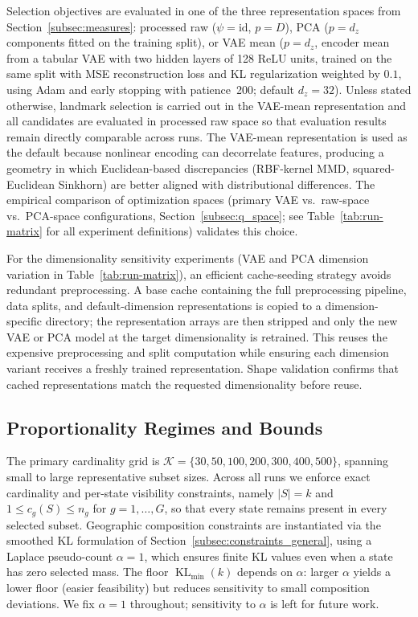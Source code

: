 \documentclass[10pt,journal]{IEEEtran}
\newcommand{\latentDim}{d_z}              %
\newcommand{\kGrid}{\mathcal{K}}
\newcommand{\kGridDef}{\{30,50,100,200,300,400,500\}}
\newcommand{\1}{\mathbf{1}}
\DeclareMathOperator{\KL}{KL}
\theoremstyle{ieeethm}
\begin{document}
Selection objectives are evaluated in one of the three representation spaces from
Section~\ref{subsec:measures}: processed raw ($\psi=\mathrm{id}$, $p=D$), PCA ($p=\latentDim$
components fitted on the training split), or VAE mean ($p=\latentDim$, encoder mean from a tabular VAE with two hidden layers of 128
ReLU units, trained on the same split with MSE reconstruction loss and KL regularization
weighted by $0.1$, using Adam and early stopping with patience~200; default $\latentDim=32$).
Unless stated otherwise, landmark selection is carried out in the VAE-mean representation and
all candidates are evaluated in processed raw space so that evaluation results remain directly
comparable across runs. The VAE-mean representation is used as the default because nonlinear
encoding can decorrelate features, producing a geometry in which Euclidean-based discrepancies
(RBF-kernel MMD, squared-Euclidean Sinkhorn) are better aligned with distributional differences.
The empirical comparison of optimization spaces (primary VAE vs.\ raw-space vs.\ PCA-space configurations,
Section~\ref{subsec:q_space}; see Table~\ref{tab:run-matrix} for all experiment definitions)
validates this choice.

For the dimensionality sensitivity experiments (VAE and PCA dimension variation in Table~\ref{tab:run-matrix}), an efficient cache-seeding strategy avoids redundant preprocessing. A base cache containing the full preprocessing pipeline, data splits, and default-dimension representations is copied to a dimension-specific directory; the representation arrays are then stripped and only the new VAE or PCA model at the target dimensionality is retrained. This reuses the expensive preprocessing and split computation while ensuring each dimension variant receives a freshly trained representation. Shape validation confirms that cached representations match the requested dimensionality before reuse.


\subsection{Proportionality Regimes and Bounds}

The primary cardinality grid is $\kGrid=\kGridDef$, spanning small to large representative subset sizes. Across all runs we enforce exact cardinality and per-state visibility constraints, namely $|S|=k$ and $1 \le c_g(S)\le n_g$ for $g=1,\dots,G$, so that every state remains present in every selected subset. Geographic composition constraints are instantiated via the smoothed KL formulation of Section~\ref{subsec:constraints_general}, using a Laplace pseudo-count $\alpha=1$, which ensures finite KL values even when a state has zero selected mass. The floor $\KL_{\min}(k)$ depends on $\alpha$: larger $\alpha$ yields a lower floor (easier feasibility) but reduces sensitivity to small composition deviations. We fix $\alpha=1$ throughout; sensitivity to $\alpha$ is left for future work.
\end{document}
